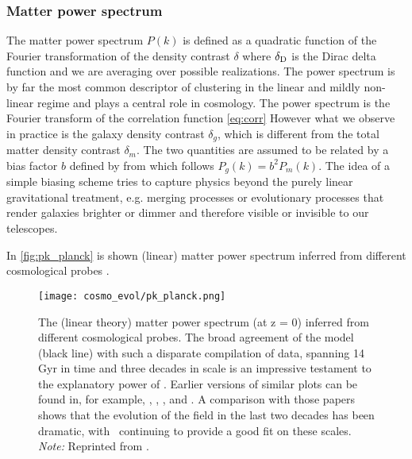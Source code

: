 \subsubsection{Matter power spectrum}
The matter power spectrum $P(k)$ is defined as a quadratic function of the Fourier transformation of the density contrast $\delta$
where $\delta_{\rm D}$ is the Dirac delta function and we are averaging over possible realizations. The power spectrum is by far the most common descriptor of clustering in the linear and mildly non-linear regime and plays a central role in cosmology. The power spectrum is the Fourier transform of the correlation function \eqref{eq:corr}
However what we observe in practice is the galaxy density contrast $\delta_g$, which is different from the total matter density contrast $\delta_m$. The two quantities are assumed to be related by a bias factor $b$ defined by
from which follows $P_g(k)=b^2P_m(k)$. The idea of a simple biasing scheme tries to capture physics beyond the purely linear gravitational treatment, e.g. merging processes or evolutionary processes that render galaxies brighter or dimmer and therefore visible or invisible to our telescopes.

In \autoref{fig:pk_planck} is shown (linear) matter power spectrum inferred from different cosmological probes \parencite{2018arXiv180706205P}.
\begin{figure}[hbt]
    \centering
    \texttt{[image: cosmo\_evol/pk\_planck.png]}
    \caption{The (linear theory) matter power spectrum (at z = 0) inferred from different cosmological probes. The broad agreement of the model (black line) with such a disparate compilation of data, spanning 14 Gyr in time and three decades in scale is an impressive testament to the explanatory power of \LCDM. Earlier versions of similar plots can be found in, for example, \textcite{1994ARA&A..32..319W}, \textcite{1995Sci...268..829S}, \textcite{2002PhRvD..66j3508T}, and \textcite{2004ApJ...606..702T}. A comparison with those papers shows that the evolution of the field in the last two decades has been dramatic, with \LCDM\ continuing to provide a good fit on these scales. \textit{Note:} Reprinted from \textcite{2018arXiv180706205P}.}
    \label{fig:pk_planck}
\end{figure}

